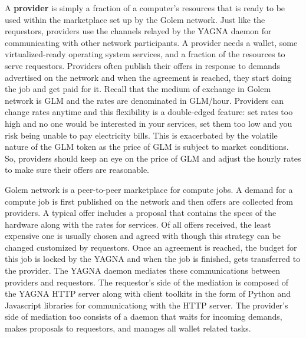 \documentclass[a4paper, 10pt]{article}
\begin{document}
A \textbf{provider} is simply a fraction of a computer's resources that is ready to be used within the marketplace set up by the Golem network. Just like the requestors, providers use the channels relayed by the YAGNA daemon for communicating with other network participants. A provider needs a wallet, some virtualized-ready operating system services, and a fraction of the resources to serve requestors. Providers often publish their offers in response to demands advertised on the network and when the agreement is reached, they start doing the job and get paid for it. Recall that the medium of exchange in Golem network is GLM and the rates are denominated in GLM/hour. Providers can change rates anytime and this flexibility is a double-edged feature: set rates too high and no one would be interested in your services, set them too low and you risk being unable to pay electricity bills. This is exacerbated by the volatile nature of the GLM token as the price of GLM is subject to market conditions. So, providers should  keep an eye on the price of GLM and adjust the hourly rates to make sure their offers are reasonable.
\par
Golem network is a peer-to-peer marketplace for compute jobs. A demand for a compute job is first published on the network and then offers are collected from providers. A typical offer includes a proposal that contains the specs of the hardware along with the rates for services. Of all offers received, the least expensive one is usually chosen and agreed with though this strategy can be changed customized by requestors. Once an agreement is reached, the budget for this job is locked by the YAGNA and when the job is finished, gets transferred to the provider. The YAGNA daemon mediates these communications between providers and requestors. The requestor's side of the mediation is composed of the YAGNA HTTP server along with client toolkits in the form of Python and Javascript libraries for communicationg with the HTTP server. The provider's side of mediation too consists of a daemon that waits for incoming demands, makes proposals to requestors, and manages all wallet related tasks.
\end{document}
